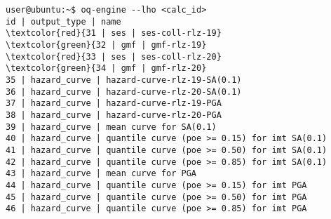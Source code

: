 \begin{Verbatim}[frame=single, commandchars=\\\{\}, fontsize=\small]
user@ubuntu:~$ oq-engine --lho <calc_id>
id | output_type | name
\textcolor{red}{31 | ses | ses-coll-rlz-19}
\textcolor{green}{32 | gmf | gmf-rlz-19}
\textcolor{red}{33 | ses | ses-coll-rlz-20}
\textcolor{green}{34 | gmf | gmf-rlz-20}
35 | hazard_curve | hazard-curve-rlz-19-SA(0.1)
36 | hazard_curve | hazard-curve-rlz-20-SA(0.1)
37 | hazard_curve | hazard-curve-rlz-19-PGA
38 | hazard_curve | hazard-curve-rlz-20-PGA
39 | hazard_curve | mean curve for SA(0.1)
40 | hazard_curve | quantile curve (poe >= 0.15) for imt SA(0.1)
41 | hazard_curve | quantile curve (poe >= 0.50) for imt SA(0.1)
42 | hazard_curve | quantile curve (poe >= 0.85) for imt SA(0.1)
43 | hazard_curve | mean curve for PGA
44 | hazard_curve | quantile curve (poe >= 0.15) for imt PGA
45 | hazard_curve | quantile curve (poe >= 0.50) for imt PGA
46 | hazard_curve | quantile curve (poe >= 0.85) for imt PGA
\end{Verbatim}